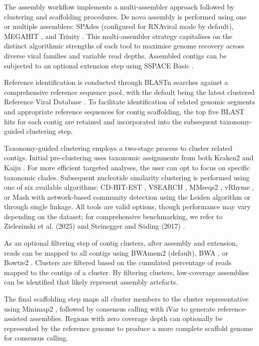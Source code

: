 The assembly workflow implements a multi-assembler approach followed by clustering and scaffolding procedures. De novo assembly is performed using one or multiple assemblers: SPAdes \cite{Meleshko2021-gb} (configured for RNAviral mode by default), MEGAHIT \cite{Li2016-sd}, and Trinity \cite{Grabherr2011-ef}. This multi-assembler strategy capitalises on the distinct algorithmic strengths of each tool to maximise genome recovery across diverse viral families and variable read depths. Assembled contigs can be subjected to an optional extension step using SSPACE Basic \cite{Boetzer2011-dh}.

Reference identification is conducted through BLASTn \cite{Altschul1990-sy} searches against a comprehensive reference sequence pool, with the default being the latest clustered Reference Viral Database \cite{Goodacre2018-dw}. To facilitate identification of related genomic segments and appropriate reference sequences for contig scaffolding, the top five BLAST hits for each contig are retained and incorporated into the subsequent taxonomy-guided clustering step.

Taxonomy-guided clustering employs a two-stage process to cluster related contigs. Initial pre-clustering uses taxonomic assignments from both Kraken2 \cite{Wood2019-jl} and Kaiju \cite{Menzel2016-tz}. For more efficient targeted analyses, the user can opt to focus on specific taxonomic clades. Subsequent nucleotide similarity clustering is performed using one of six available algorithms: CD-HIT-EST \cite{Li2006-nj}, VSEARCH \cite{Rognes2016-ju}, MMseqs2 \cite{Steinegger2017-ci}, vRhyme \cite{Kieft2022-km}, or Mash \cite{Ondov2019-bo} with network-based community detection using the Leiden algorithm \cite{Traag2019-yd} or through single linkage.  All tools are valid options, though performance may vary depending on the dataset; for comprehensive benchmarking, we refer to Zielezinski et al. (2025) \cite{Zielezinski2025-vl} and Steinegger and Söding (2017) \cite{Steinegger2017-ci}.

As an optional filtering step of contig clusters, after assembly and extension, reads can be mapped to all contigs using BWAmem2 \cite{Vasimuddin2019-rb} (default), BWA \cite{Li2013-pp}, or Bowtie2 \cite{Langmead2019-wx}. Clusters are filtered based on the cumulated percentage of reads mapped to the contigs of a cluster. By filtering clusters, low-coverage assemblies can be identified that likely represent assembly artefacts.

The final scaffolding step maps all cluster members to the cluster representative using Minimap2 \cite{Li2018-gi}, followed by consensus calling with iVar \cite{Grubaugh2019-xd} to generate reference-assisted assemblies. Regions with zero coverage depth can optionally be represented by the reference genome to produce a more complete scaffold genome for consensus calling.

